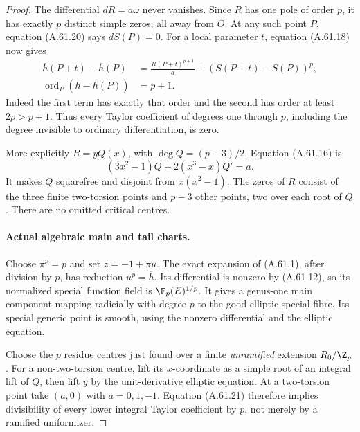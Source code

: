 \begin{proof}
The differential \(dR=a\omega\) never vanishes.
Since \(R\) has one pole of order \(p\), it has
exactly \(p\) distinct simple zeros, all away from
\(O\). At any such point \(P\), equation
(A.61.20) says \(dS(P)=0\). For a local parameter
\(t\), equation (A.61.18) now gives
\[
 \begin{aligned}
 \overline h(P+t)-\overline h(P)
       &=\frac{R(P+t)^{p+1}}a+(S(P+t)-S(P))^p,\\
 \operatorname{ord}_P(\overline h-\overline h(P))&=p+1.
 \end{aligned}
                                                        \tag{A.61.21}
\]
Indeed the first term has exactly that order and
the second has order at least \(2p>p+1\).
Thus every Taylor coefficient of degrees one
through \(p\), including the degree invisible
to ordinary differentiation, is zero.

More explicitly \(R=yQ(x)\), with
\(\deg Q=(p-3)/2\). Equation (A.61.16) is
\[
       (3x^2-1)Q+2(x^3-x)Q'=a.                         \tag{A.61.22}
\]
It makes \(Q\) squarefree and disjoint from
\(x(x^2-1)\). The zeros of \(R\) consist of
the three finite two-torsion points and
\(p-3\) other points, two over each root of
\(Q\). There are no omitted critical centres.

\paragraph{Actual algebraic main and tail charts.}
Choose \(\pi^p=p\) and set \(z=-1+\pi u\).
The exact expansion of (A.61.1), after division
by \(p\), has reduction \(u^p=\overline h\).
Its differential is nonzero by (A.61.12), so its
normalized special function field is
\(\F_p(E)^{1/p}\). It gives a genus-one main
component mapping radicially with degree \(p\)
to the good elliptic special fibre. Its special
generic point is smooth, using the nonzero
differential and the elliptic equation.

Choose the \(p\) residue centres just found over
a finite \emph{unramified} extension \(R_0/\Z_p\).
For a non-two-torsion centre, lift its \(x\)-coordinate
as a simple root of an integral lift of \(Q\), then
lift \(y\) by the unit-derivative elliptic equation.
At a two-torsion point take \((a,0)\) with
\(a=0,1,-1\). Equation (A.61.21) therefore implies
divisibility of every lower integral Taylor
coefficient by \(p\), not merely by a ramified
uniformizer.


\end{proof}
